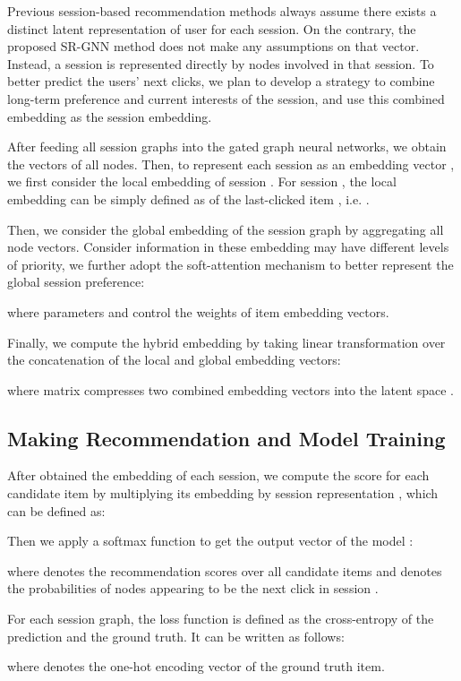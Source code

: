 \documentclass[letterpaper]{article} \usepackage{cite}
\begin{document}
Previous session-based recommendation methods always assume there exists a distinct latent representation of user for each session. On the contrary, the proposed SR-GNN method does not make any assumptions on that vector. Instead, a session is represented directly by nodes involved in that session. To better predict the users' next clicks, we plan to develop a strategy to combine long-term preference and current interests of the session, and use this combined embedding as the session embedding.

After feeding all session graphs into the gated graph neural networks, we obtain the vectors of all nodes. Then, to represent each session as an embedding vector , we first consider the local embedding  of session . For session , the local embedding can be simply defined as  of the last-clicked item , i.e. .

Then, we consider the global embedding  of the session graph  by aggregating all node vectors. Consider information in these embedding may have different levels of priority, we further adopt the soft-attention mechanism to better represent the global session preference:

where parameters  and  control the weights of item embedding vectors.

Finally, we compute the hybrid embedding  by taking linear transformation over the concatenation of the local and global embedding vectors:

where matrix  compresses two combined embedding vectors into the latent space .

\subsection{Making Recommendation and Model Training}
After obtained the embedding of each session, we compute the score  for each candidate item  by multiplying its embedding  by session representation , which can be defined as:


Then we apply a softmax function to get the output vector of the model :

where  denotes the recommendation scores over all candidate items and  denotes the probabilities of nodes appearing to be the next click in session .

For each session graph, the loss function is defined as the cross-entropy of the prediction and the ground truth. It can be written as follows:

where  denotes the one-hot encoding vector of the ground truth item.
\end{document}
